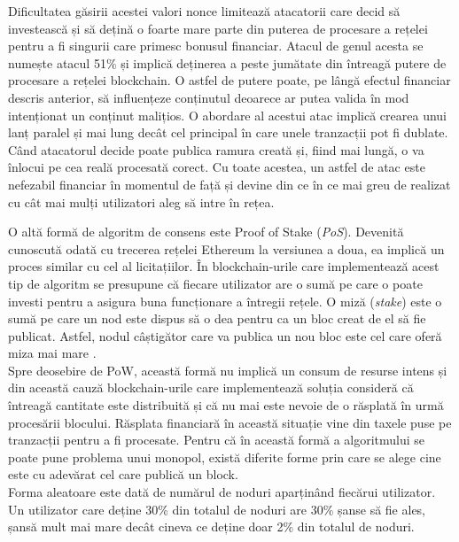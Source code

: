 Dificultatea găsirii acestei valori nonce limitează atacatorii care decid să investească și să dețină o foarte mare parte din puterea de procesare a rețelei pentru a fi singurii care primesc bonusul financiar. Atacul de genul acesta se numește atacul 51\% și implică deținerea a peste jumătate din întreagă putere de procesare a rețelei blockchain. O astfel de putere poate, pe lângă efectul financiar descris anterior, să influențeze conținutul deoarece ar putea valida în mod intenționat un conținut malițios. O abordare al acestui atac implică crearea unui lanț paralel și mai lung decât cel principal în care unele tranzacții pot fi dublate. Când atacatorul decide poate publica ramura creată și, fiind mai lungă, o va înlocui pe cea reală procesată corect. Cu toate acestea, un astfel de atac este nefezabil financiar în momentul de față și devine din ce în ce mai greu de realizat cu cât mai mulți utilizatori aleg să intre în rețea.\\

\clearpage

O altă formă de algoritm de consens este Proof of Stake (\textit{PoS}). Devenită cunoscută odată cu trecerea rețelei Ethereum la versiunea a doua, ea implică un proces similar cu cel al licitațiilor. În blockchain-urile care implementează acest tip de algoritm se presupune că fiecare utilizator are o sumă pe care o poate investi pentru a asigura buna funcționare a întregii rețele. O miză (\textit{stake}) este o sumă pe care un nod este dispus să o dea pentru ca un bloc creat de el să fie publicat. Astfel, nodul câștigător care va publica un nou bloc este cel care oferă miza mai mare \cite{Blockchain_Overview_NIST}.\\

Spre deosebire de PoW, această formă nu implică un consum de resurse intens și din această cauză blockchain-urile care implementează soluția consideră că întreagă cantitate este distribuită și că nu mai este nevoie de o răsplată în urmă procesării blocului. Răsplata financiară în această situație vine din taxele puse pe tranzacții pentru a fi procesate. Pentru că în această formă a algoritmului se poate pune problema unui monopol, există diferite forme prin care se alege cine este cu adevărat cel care publică un block.\\

Forma aleatoare este dată de numărul de noduri aparținând fiecărui utilizator. Un utilizator care deține 30\% din totalul de noduri are 30\% șanse să fie ales, șansă mult mai mare decât cineva ce deține doar 2\% din totalul de noduri. 

